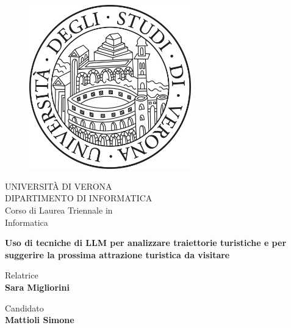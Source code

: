 \begin{titlepage}
\begin{figure}[H]
    \centering
    \includegraphics[width=7cm]{images/univr.png}
\end{figure}

\begin{center}
    \LARGE{UNIVERSITÀ DI VERONA}
    \vspace{1mm}
    \\ \large{DIPARTIMENTO DI INFORMATICA }
    \vspace{5mm}
    \\ \LARGE{Corso di Laurea Triennale in \\ Informatica}
\end{center}

\vspace{15mm}
\begin{center}
    {\LARGE{\bf Uso di tecniche di LLM per analizzare traiettorie turistiche e per suggerire la prossima attrazione turistica da visitare}}
\end{center}
\vspace{30mm}

\begin{minipage}[t]{0.47\textwidth}
	{\large{Relatrice}{\normalsize\vspace{3mm}
	\bf\\ \large{Sara Migliorini}}}
\end{minipage}
\hfill
\begin{minipage}[t]{0.47\textwidth}\raggedleft
	{\large{Candidato}{\normalsize\vspace{3mm}
	\bf\\ \large{Mattioli Simone \vspace{2mm}}}}
\end{minipage}

\end{titlepage}